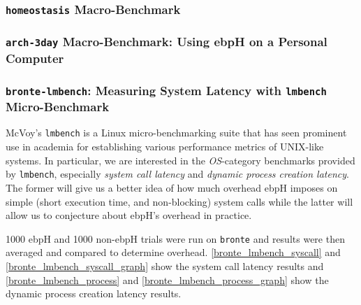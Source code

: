 \documentclass[
  12pt]{findlay}
\begin{document}
\FloatBarrier

\hypertarget{homeostasis-macro-benchmark}{%
\subsubsection{\texorpdfstring{\texttt{homeostasis}
Macro-Benchmark}{homeostasis Macro-Benchmark}}\label{homeostasis-macro-benchmark}}

\hypertarget{arch-3day-macro-benchmark-using-ebph-on-a-personal-computer}{%
\subsubsection{\texorpdfstring{\texttt{arch-3day} Macro-Benchmark: Using
ebpH on a Personal
Computer}{arch-3day Macro-Benchmark: Using ebpH on a Personal Computer}}\label{arch-3day-macro-benchmark-using-ebph-on-a-personal-computer}}

\hypertarget{bronte-lmbench-measuring-system-latency-with-lmbench-micro-benchmark}{%
\subsubsection{\texorpdfstring{\texttt{bronte-lmbench}: Measuring System
Latency with \texttt{lmbench}
Micro-Benchmark}{bronte-lmbench: Measuring System Latency with lmbench Micro-Benchmark}}\label{bronte-lmbench-measuring-system-latency-with-lmbench-micro-benchmark}}

McVoy's \passthrough{\lstinline!lmbench!} \autocite{lmbench,lmbenchgit}
is a Linux micro-benchmarking suite that has seen prominent use in
academia \autocite{lmbenchex1,lmbenchex2,lmbenchex3} for establishing
various performance metrics of UNIX-like systems. In particular, we are
interested in the \emph{OS}-category benchmarks provided by
\passthrough{\lstinline!lmbench!}, especially \emph{system call latency}
and \emph{dynamic process creation latency}. The former will give us a
better idea of how much overhead ebpH imposes on simple (short execution
time, and non-blocking) system calls while the latter will allow us to
conjecture about ebpH's overhead in practice.

1000 ebpH and 1000 non-ebpH trials were run on
\passthrough{\lstinline!bronte!} and results were then averaged and
compared to determine overhead. \autoref{bronte_lmbench_syscall} and
\autoref{bronte_lmbench_syscall_graph} show the system call latency
results and \autoref{bronte_lmbench_process} and
\autoref{bronte_lmbench_process_graph} show the dynamic process creation
latency results.
\end{document}
